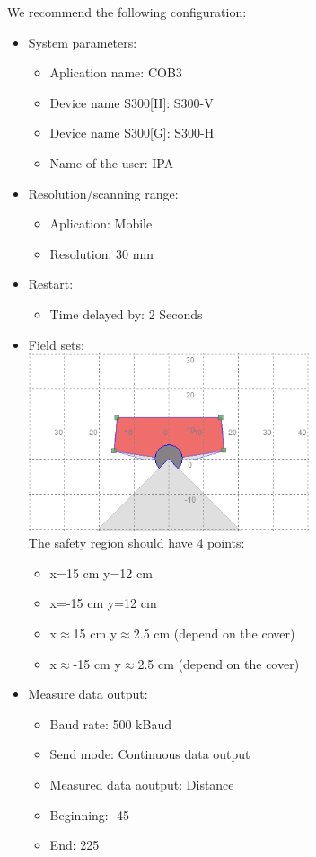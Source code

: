 We recommend the following configuration:
\begin{itemize}
\item System parameters:
\begin{itemize}
\item Aplication name: COB3
\item Device name S300[H]: S300-V
\item Device name S300[G]: S300-H
\item Name of the user: IPA
\end{itemize}
\item Resolution/scanning range:
\begin{itemize}
\item Aplication: Mobile
\item Resolution: 30 mm
\end{itemize}
\item Restart:
\begin{itemize}
\item Time delayed by: 2 Seconds
\end{itemize}
\item Field sets:
\\
\includegraphics[width=0.65\textwidth]{images/area.png}
\\ The safety region should have 4 points:
\begin{itemize}
\item x=15 cm y=12 cm
\item x=-15 cm y=12 cm
\item x$\approx$15 cm y$\approx$2.5 cm (depend on the cover)
\item x$\approx$-15 cm y$\approx$2.5 cm (depend on the cover)
\end{itemize}
\item Measure data output:
\begin{itemize}
\item Baud rate: 500 kBaud
\item Send mode: Continuous data output
\item Measured data aoutput: Distance
\item Beginning: -45
\item End: 225
\end{itemize}
\end{itemize}

